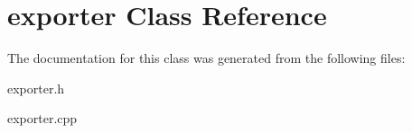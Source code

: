 \hypertarget{classexporter}{\section{exporter \-Class \-Reference}
\label{classexporter}
}


\-The documentation for this class was generated from the following files\-:\begin{DoxyCompactItemize}
\item 
exporter.\-h\item 
exporter.\-cpp\end{DoxyCompactItemize}
